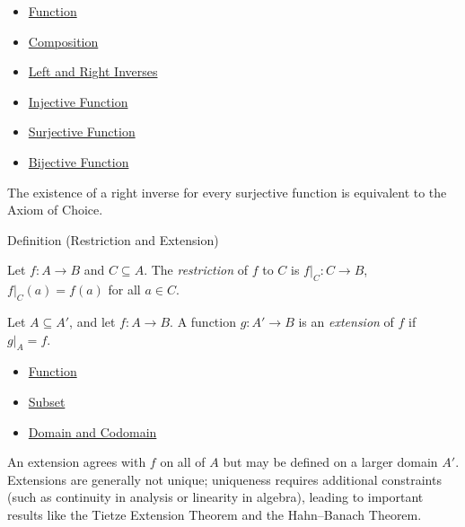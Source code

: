 \begin{dependencies}
\begin{itemize}
  \item \hyperref[def:function]{Function}
  \item \hyperref[def:composition]{Composition}
  \item \hyperref[def:left-right-inverse]{Left and Right Inverses}
  \item \hyperref[def:injective]{Injective Function}
  \item \hyperref[def:surjective]{Surjective Function}
  \item \hyperref[def:bijective]{Bijective Function}
\end{itemize}
\end{dependencies}

\begin{remark*}
The existence of a right inverse for every surjective function is equivalent
to the Axiom of Choice.
\end{remark*}

\begin{definitionbox}{Definition (Restriction and Extension)}
\begin{definition}\label{def:restriction}
Let $f : A \to B$ and $C \subseteq A$. The \emph{restriction} of $f$ to $C$
is $f|_C : C \to B$, $f|_C(a) = f(a)$ for all $a \in C$.

Let $A \subseteq A'$, and let $f : A \to B$. A function $g : A' \to B$ is an
\emph{extension} of $f$ if $g|_A = f$.
\end{definition}
\end{definitionbox}

\begin{dependencies}
\begin{itemize}
  \item \hyperref[def:function]{Function}
  \item \hyperref[def:subset]{Subset}
  \item \hyperref[def:domain-codomain]{Domain and Codomain}
\end{itemize}
\end{dependencies}

\begin{remark*}
\label{def:fn-extension}
An extension agrees with $f$ on all of $A$ but may be defined on a larger
domain $A'$. Extensions are generally not unique; uniqueness requires additional
constraints (such as continuity in analysis or linearity in algebra), leading to
important results like the Tietze Extension Theorem and the Hahn--Banach
Theorem.
\end{remark*}

